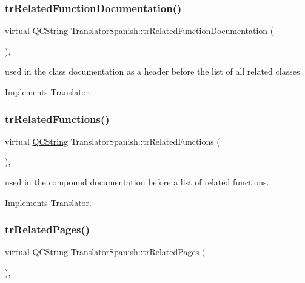 \subsubsection{\texorpdfstring{trRelatedFunctionDocumentation()}{trRelatedFunctionDocumentation()}}
{\footnotesize\ttfamily virtual \mbox{\hyperlink{class_q_c_string}{Q\+C\+String}} Translator\+Spanish\+::tr\+Related\+Function\+Documentation (\begin{DoxyParamCaption}{ }\end{DoxyParamCaption})\hspace{0.3cm}{\ttfamily [inline]}, {\ttfamily [virtual]}}

used in the class documentation as a header before the list of all related classes 

Implements \mbox{\hyperlink{class_translator}{Translator}}.

\mbox{\label{class_translator_spanish_a9798387ffd549362ce2cd3dce5894c71}} 
\subsubsection{\texorpdfstring{trRelatedFunctions()}{trRelatedFunctions()}}
{\footnotesize\ttfamily virtual \mbox{\hyperlink{class_q_c_string}{Q\+C\+String}} Translator\+Spanish\+::tr\+Related\+Functions (\begin{DoxyParamCaption}{ }\end{DoxyParamCaption})\hspace{0.3cm}{\ttfamily [inline]}, {\ttfamily [virtual]}}

used in the compound documentation before a list of related functions. 

Implements \mbox{\hyperlink{class_translator}{Translator}}.

\mbox{\label{class_translator_spanish_a80186f14bb14665e901c3bdc9767dc9b}} 
\subsubsection{\texorpdfstring{trRelatedPages()}{trRelatedPages()}}
{\footnotesize\ttfamily virtual \mbox{\hyperlink{class_q_c_string}{Q\+C\+String}} Translator\+Spanish\+::tr\+Related\+Pages (\begin{DoxyParamCaption}{ }\end{DoxyParamCaption})\hspace{0.3cm}{\ttfamily [inline]}, {\ttfamily [virtual]}}

